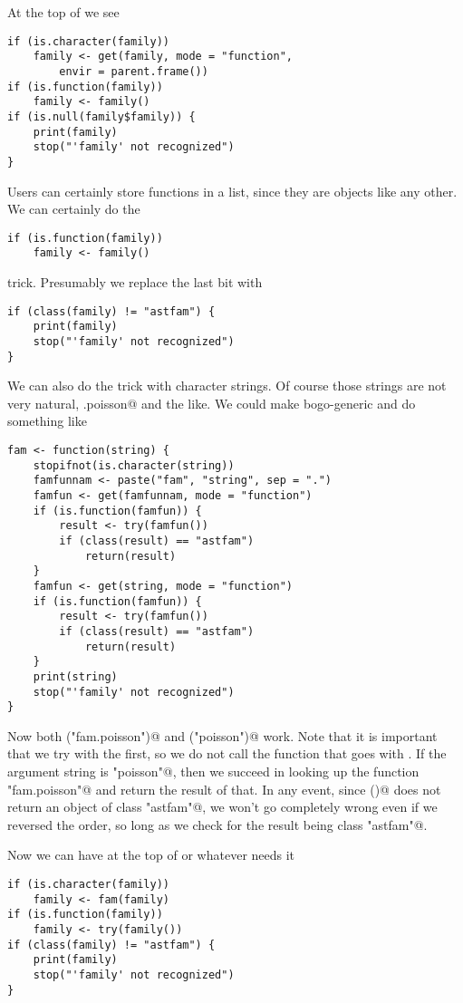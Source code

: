 \documentclass[11pt]{article}
\begin{document}
At the top of \verb@glm@ we see
\begin{verbatim}
if (is.character(family))
    family <- get(family, mode = "function",
        envir = parent.frame())
if (is.function(family))
    family <- family()
if (is.null(family$family)) {
    print(family)
    stop("'family' not recognized")
}
\end{verbatim}
Users can certainly store functions in a list, since they are objects
like any other.  We can certainly do the
\begin{verbatim}
if (is.function(family))
    family <- family()
\end{verbatim}
trick.  Presumably we replace the last bit with
\begin{verbatim}
if (class(family) != "astfam") {
    print(family)
    stop("'family' not recognized")
}
\end{verbatim}
We can also do the trick with character strings.
Of course those strings are not very natural,
\verb@fam.poisson@ and the like.
We could make \verb@fam@ bogo-generic and do something like
\begin{verbatim}
fam <- function(string) {
    stopifnot(is.character(string))
    famfunnam <- paste("fam", "string", sep = ".")
    famfun <- get(famfunnam, mode = "function")
    if (is.function(famfun)) {
        result <- try(famfun())
        if (class(result) == "astfam")
            return(result)
    }
    famfun <- get(string, mode = "function")
    if (is.function(famfun)) {
        result <- try(famfun())
        if (class(result) == "astfam")
            return(result)
    }
    print(string)
    stop("'family' not recognized")
}
\end{verbatim}
Now both \verb@fam("fam.poisson")@ and \verb@fam("poisson")@ work.
Note that it is important that we try with
the \verb@famfunnam@ first, so we do not call the \verb@poisson@
function that goes with \verb@glm@.  If the argument string is
\verb@"poisson"@, then we succeed in looking up the function
\verb@"fam.poisson"@ and return the result of that.
In any event, since \verb@poisson()@ does not return an object
of class \verb@"astfam"@, we won't go completely wrong
even if we reversed the order, so long as we check for the
result being class \verb@"astfam"@.

Now we can have at the top of \verb@aster@ or whatever needs it
\begin{verbatim}
if (is.character(family))
    family <- fam(family)
if (is.function(family))
    family <- try(family())
if (class(family) != "astfam") {
    print(family)
    stop("'family' not recognized")
}
\end{verbatim}
\end{document}
